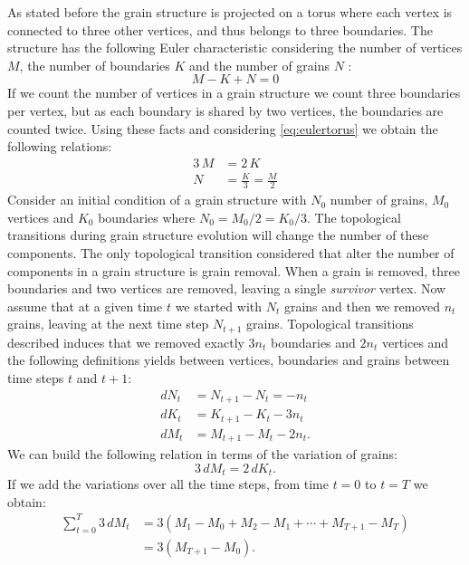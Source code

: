 As stated before the grain structure is projected on a torus where each vertex is connected to three other vertices, and thus belongs to three boundaries. The structure has the following Euler characteristic considering the number of vertices $M$, the number of boundaries $K$ and the number of grains $N$ \cite{sausset2007periodic}:
\begin{equation}
M - K + N = 0
\label{eq:eulertorus}
\end{equation}
If we count the number of vertices in a grain structure we count three boundaries per vertex, but as each boundary is shared by two vertices, the boundaries are counted twice. Using these facts and considering \eqref{eq:eulertorus} we obtain the following relations:
\begin{align*}
    3\,M &= 2\,K\\
    N &= \frac{K}{3} = \frac{M}{2}
\end{align*}
 Consider an initial condition of a grain structure with $N_0$ number of grains, $M_0$ vertices and $K_0$ boundaries where $N_0 = M_0/2 = K_0 / 3$. 
 The topological transitions during grain structure evolution will change the number of these components. 
 The only topological transition considered that alter the number of components in a grain structure is  grain removal. 
 When a grain is removed, three boundaries and two vertices are removed, leaving a single \emph{survivor} vertex.
 Now assume that at a given time $t$ we started with $N_t$ grains and then we removed $n_t$ grains, leaving at the next time step $N_{t+1}$ grains.
 Topological transitions described induces that we removed exactly $3n_t$ boundaries and $2n_t$ vertices and the following definitions yields between vertices, boundaries and grains between time steps $t$ and $t+1$:
 \begin{align*}
     dN_t &= N_{t+1} - N_{t} =  - n_t\\
     dK_t &= K_{t+1} - K_{t} - 3n_t\\
     dM_t &= M_{t+1} - M_{t} - 2n_t.
 \end{align*}
We can build the following relation in terms of the variation of grains:
\begin{equation}
    3\,dM_t = 2\,dK_t. \label{eq:dMdK}
\end{equation}
If we add the variations over all the time steps, from time $t=0$ to $t=T$ we obtain:
\begin{align*}
    \sum_{t=0}^{T}3\,dM_t &= 3(M_1 - M_0 + M_2 - M_1 + \cdots + M_{T+1} - M_T) \\
    &= 3(M_{T+1} - M_0).
\end{align*}

